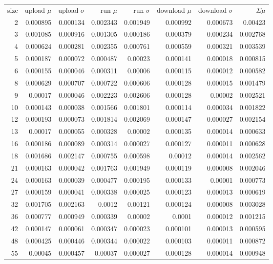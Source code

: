 \begin{longtable}{r r r r r r r r}
size & upload $\mu$  & upload $\sigma$ & run $\mu$ & run $\sigma$ & download $\mu$ & download $\sigma$ & $\Sigma \mu$ \\
2 & 0.000895 & 0.000134 & 0.002343 & 0.001949 & 0.000992 & 0.000673 & 0.00423 \\
3 & 0.001085 & 0.000916 & 0.001305 & 0.000186 & 0.000379 & 0.000234 & 0.002768 \\
4 & 0.000624 & 0.000281 & 0.002355 & 0.000761 & 0.000559 & 0.000321 & 0.003539 \\
5 & 0.000187 & 0.000072 & 0.000487 & 0.00023 & 0.000141 & 0.000018 & 0.000815 \\
6 & 0.000155 & 0.000046 & 0.000311 & 0.00006 & 0.000115 & 0.000012 & 0.000582 \\
8 & 0.000629 & 0.000707 & 0.000722 & 0.000606 & 0.000128 & 0.000015 & 0.001479 \\
9 & 0.00017 & 0.000046 & 0.002223 & 0.002606 & 0.000128 & 0.00002 & 0.002521 \\
10 & 0.000143 & 0.000038 & 0.001566 & 0.001801 & 0.000114 & 0.000034 & 0.001822 \\
12 & 0.000193 & 0.000073 & 0.001814 & 0.002069 & 0.000147 & 0.000027 & 0.002154 \\
13 & 0.00017 & 0.000055 & 0.000328 & 0.00002 & 0.000135 & 0.000014 & 0.000633 \\
16 & 0.000186 & 0.000089 & 0.000314 & 0.000027 & 0.000127 & 0.000011 & 0.000628 \\
18 & 0.001686 & 0.002147 & 0.000755 & 0.000598 & 0.00012 & 0.000014 & 0.002562 \\
21 & 0.000163 & 0.000042 & 0.001763 & 0.001949 & 0.000119 & 0.000008 & 0.002046 \\
24 & 0.000163 & 0.000039 & 0.000477 & 0.000195 & 0.000133 & 0.00001 & 0.000773 \\
27 & 0.000159 & 0.000041 & 0.000338 & 0.000025 & 0.000123 & 0.000013 & 0.000619 \\
32 & 0.001705 & 0.002163 & 0.0012 & 0.00121 & 0.000124 & 0.000008 & 0.003028 \\
36 & 0.000777 & 0.000949 & 0.000339 & 0.00002 & 0.0001 & 0.000012 & 0.001215 \\
42 & 0.000147 & 0.000061 & 0.000347 & 0.000023 & 0.000101 & 0.000013 & 0.000595 \\
48 & 0.000425 & 0.000446 & 0.000344 & 0.000022 & 0.000103 & 0.000011 & 0.000872 \\
55 & 0.00045 & 0.000457 & 0.00037 & 0.000027 & 0.000128 & 0.000014 & 0.000948 \\

\end{longtable}
